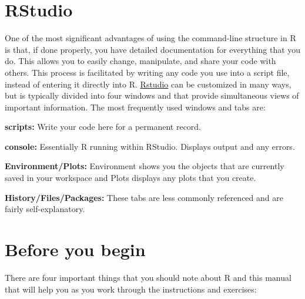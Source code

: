 \documentclass[
]{book}
\begin{document}
\hypertarget{rstudio}{%
\section{RStudio}\label{rstudio}}

One of the most significant advantages of using the command-line structure in R is that, if done properly, you have detailed documentation for everything that you do. This allows you to easily change, manipulate, and share your code with others. This process is facilitated by writing any code you use into a script file, instead of entering it directly into R. \href{http://www.rstudio.com/ide/}{Rstudio} can be customized in many ways, but is typically divided into four windows and that provide simultaneous views of important information. The most frequently used windows and tabs are:

\textbf{scripts:} Write your code here for a permanent record.

\textbf{console:} Essentially R running within RStudio. Displays output and any errors.

\textbf{Environment/Plots:} Environment shows you the objects that are currently saved in your workspace and Plots displays any plots that you create.

\textbf{History/Files/Packages:} These tabs are less commonly referenced and are fairly self-explanatory.

\hypertarget{before-you-begin}{%
\section{Before you begin}\label{before-you-begin}}

There are four important things that you should note about R and this manual that will help you as you work through the instructions and exercises:
\end{document}

